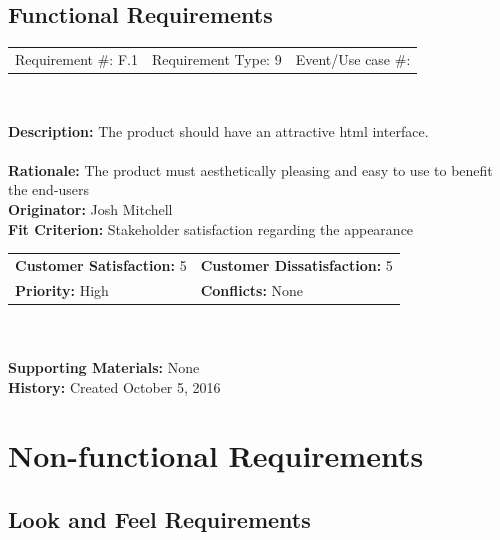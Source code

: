 \documentclass[12pt, titlepage]{article}
\begin{document}
\subsection{Functional Requirements}
\begin{framed}
	
	\begin{center}
		
		\begin{tabular}{ l c r }
			Requirement \#: F.1 & Requirement Type: 9 & Event/Use case \#: \\
		\end{tabular} \\
	\end{center}
	\textbf{Description:} The product should have an attractive html interface. \\
	\\
	\textbf{Rationale:} The product must aesthetically pleasing and easy to use
	to benefit the end-users \\
	\textbf{Originator:} Josh Mitchell \\
	\textbf{Fit Criterion:} Stakeholder satisfaction regarding the appearance  \\
	
	\begin{tabular}{ll}
		\textbf{Customer Satisfaction:} 5 & \textbf{Customer Dissatisfaction:} 5 \\
		\textbf{Priority:} High & \textbf{Conflicts:} None\\
	\end{tabular} \\
	\\
	\textbf{Supporting Materials:} None \\
	\textbf{History:} Created October 5, 2016
	
\end{framed}

\section{Non-functional Requirements}

\subsection{Look and Feel Requirements}
\end{document}
